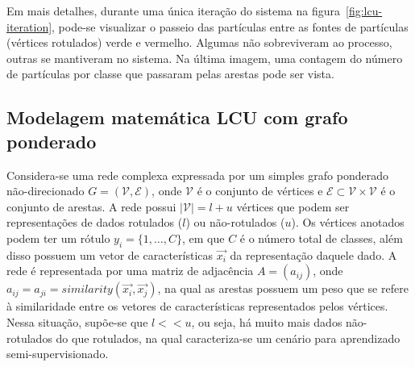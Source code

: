 Em mais detalhes, durante uma única iteração do sistema na
figura~\ref{fig:lcu-iteration}, pode-se visualizar o passeio das
partículas entre as fontes de partículas (vértices rotulados) verde e
vermelho. Algumas não sobreviveram ao processo, outras se mantiveram
no sistema. Na última imagem, uma contagem do número de partículas por
classe que passaram pelas arestas pode ser vista.


\begin{figure}[h!]
        \captionsetup{width=8cm}
		\centering
\end{figure}


\subsection{Modelagem matemática LCU com grafo ponderado}\label{sec:lcu-math}

Considera-se uma rede complexa expressada por um simples grafo
ponderado não-direcionado $G = (\mathcal{V}, \mathcal{E})$, onde $\mathcal{V}$ é o conjunto de
vértices e $\mathcal{E} \subset \mathcal{V} \times \mathcal{V}$ é o conjunto de arestas. A rede possui
$\left|\mathcal{V}\right| = l + u$ vértices que podem ser representações de
dados rotulados ($ l $) ou não-rotulados ($ u $). Os vértices anotados
podem ter um rótulo $y_i = \{1, \ldots, C\}$, em que $C$ é o número total de
classes, além disso possuem um vetor de características $\vec{x_i}$ da
representação daquele dado. A rede é representada por uma matriz de
adjacência $A = (a_{ij})$, onde $a_{ij} =a_{ji} =
similarity(\vec{x_i}, \vec{x_j})$, na qual as arestas possuem um peso
que se refere à similaridade entre os vetores de características
representados pelos vértices. Nessa situação, supõe-se que $l << u$,
ou seja, há muito mais dados não-rotulados do que rotulados, na qual
caracteriza-se um cenário para aprendizado semi-supervisionado.

